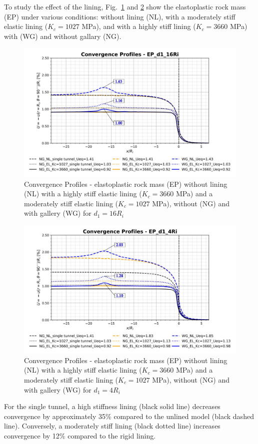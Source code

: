 \documentclass[a4paper,fleqn]{cas-sc}
\begin{document}
To study the effect of the lining, Fig.~\ref{EP_d1_16Ri} and \ref{EP_d1_4Ri} show the elastoplastic rock mass (EP) under various conditions: without lining (NL), with a moderately stiff elastic lining ($K_c = 1027$ MPa), and with a highly stiff lining ($K_c = 3660$ MPa) with (WG) and without gallary (NG).
\begin{figure}[h!]
	\centering
	\includegraphics[scale=0.5]{Convergence Profiles - EP_d1_16Ri.pdf}
	\caption{Convergence Profiles - elastoplastic rock mass (EP) without lining (NL) with a highly stiff elastic lining ($K_c = 3660$ MPa) and a moderately stiff elastic lining ($K_c = 1027$ MPa), without (NG) and with gallery (WG) for $d_1 = 16R_i$}
	\label{EP_d1_16Ri}
\end{figure}
\FloatBarrier
\begin{figure}[h!]
	\centering
	\includegraphics[scale=0.5]{Convergence Profiles - EP_d1_4Ri.pdf}
	\caption{Convergence Profiles - elastoplastic rock mass (EP) without lining (NL) with a highly stiff elastic lining ($K_c = 3660$ MPa) and a moderately stiff elastic lining ($K_c = 1027$ MPa), without (NG) and with gallery (WG) for $d_1 = 4R_i$}
	\label{EP_d1_4Ri}
\end{figure}
\FloatBarrier
For the single tunnel, a high stiffness lining (black solid line) decreases convergence by approximately 35\% compared to the unlined model (black dashed line). Conversely, a moderately stiff lining (black dotted line) increases convergence by 12\% compared to the rigid lining. 
\end{document}
